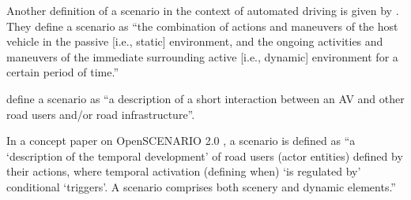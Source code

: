 Another definition of a scenario in the context of automated driving is given by \textcite{elrofai2016scenario}. They define a scenario as ``the combination of actions and maneuvers of the host vehicle in the passive [i.e., static] environment, and the ongoing activities and maneuvers of the immediate surrounding active [i.e., dynamic] environment for a certain period of time.'' 

\cstartb
\textcite{catapult2018regulating} define a scenario as ``a description of a short interaction between an AV and other road users and/or road infrastructure''. 

In a concept paper on OpenSCENARIO 2.0 \autocite{OpenSCENARIO2}, a scenario is defined as ``a `description of the temporal development' of road users (actor entities) defined by their actions, where temporal activation (defining when) `is regulated by' conditional `triggers'. A scenario comprises both scenery and dynamic elements.'' \cendb



